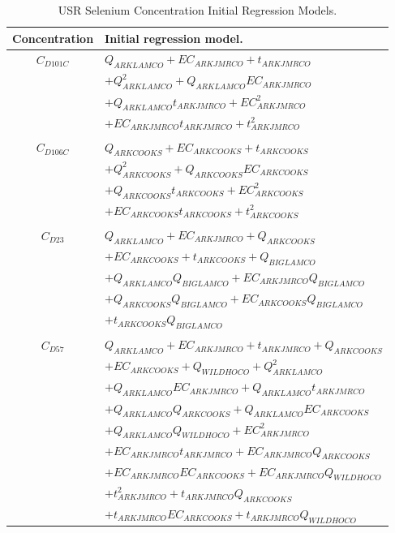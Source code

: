 \begin{table}[htbp]
\centering
\caption{USR Selenium Concentration Initial Regression Models.}
\label{tab:DSRInitialRegression}
\begin{tabular}{c l}
	\toprule
	Concentration		& Initial regression model. \\
	\toprule
	$ C_{D101C} $	& $Q_{ARKLAMCO} + EC_{ARKJMRCO} + t_{ARKJMRCO}$\\
					& $+Q_{ARKLAMCO}^2 + Q_{ARKLAMCO}EC_{ARKJMRCO}$\\
					& $+ Q_{ARKLAMCO}t_{ARKJMRCO} + EC_{ARKJMRCO}^2$\\
					& $+ EC_{ARKJMRCO}t_{ARKJMRCO} + t_{ARKJMRCO}^2$\\
	\\
	$ C_{D106C} $	& $Q_{ARKCOOKS} + EC_{ARKCOOKS} + t_{ARKCOOKS}$\\
					& $+Q_{ARKCOOKS}^2 + Q_{ARKCOOKS}EC_{ARKCOOKS}$\\
					& $+ Q_{ARKCOOKS}t_{ARKCOOKS} + EC_{ARKCOOKS}^2$\\
					& $+ EC_{ARKCOOKS}t_{ARKCOOKS} + t_{ARKCOOKS}^2$\\
	\\
	$ C_{D23} $		& $Q_{ARKLAMCO} + EC_{ARKJMRCO} + Q_{ARKCOOKS}$\\ 
					& $+ EC_{ARKCOOKS} + t_{ARKCOOKS} + Q_{BIGLAMCO}$\\
					& $+ Q_{ARKLAMCO}Q_{BIGLAMCO} + EC_{ARKJMRCO}Q_{BIGLAMCO}$\\
					& $+ Q_{ARKCOOKS}Q_{BIGLAMCO} + EC_{ARKCOOKS}Q_{BIGLAMCO}$\\
					& $+ t_{ARKCOOKS}Q_{BIGLAMCO}$\\
	\\
	$ C_{D57} $		& $Q_{ARKLAMCO} + EC_{ARKJMRCO} + t_{ARKJMRCO} + Q_{ARKCOOKS}$\\
					& $+ EC_{ARKCOOKS} + Q_{WILDHOCO} + Q_{ARKLAMCO}^2 $\\
					& $+ Q_{ARKLAMCO} EC_{ARKJMRCO}+ Q_{ARKLAMCO} t_{ARKJMRCO} $\\
					& $+ Q_{ARKLAMCO} Q_{ARKCOOKS}+ Q_{ARKLAMCO} EC_{ARKCOOKS} $\\
					& $+ Q_{ARKLAMCO} Q_{WILDHOCO}+ EC_{ARKJMRCO}^2 $\\
					& $+ EC_{ARKJMRCO} t_{ARKJMRCO}+ EC_{ARKJMRCO} Q_{ARKCOOKS} $\\
					& $+ EC_{ARKJMRCO} EC_{ARKCOOKS}+ EC_{ARKJMRCO} Q_{WILDHOCO} $\\
					& $+ t_{ARKJMRCO}^2+ t_{ARKJMRCO} Q_{ARKCOOKS} $\\
					& $+ t_{ARKJMRCO} EC_{ARKCOOKS}+ t_{ARKJMRCO} Q_{WILDHOCO} $\\

\end{tabular}
\end{table}
